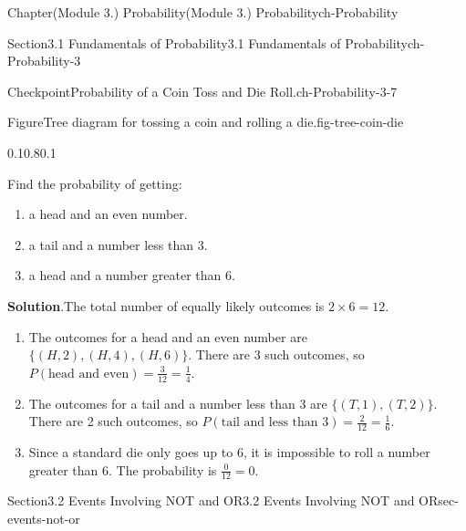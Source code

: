 \documentclass[oneside,10pt,]{book}
\newcommand{\blocktitlefont}{\relax}
\begin{document}
\begin{chapterptx}{Chapter}{(Module 3.) Probability}{}{(Module 3.) Probability}{}{}{ch-Probability}
\begin{sectionptx}{Section}{3.1 Fundamentals of Probability}{}{3.1 Fundamentals of Probability}{}{}{ch-Probability-3}
\begin{inlineexercise}{Checkpoint}{Probability of a Coin Toss and Die Roll.}{ch-Probability-3-7}
\begin{figureptx}{Figure}{Tree diagram for tossing a coin and rolling a die.}{fig-tree-coin-die}{}
\begin{image}{0.1}{0.8}{0.1}{}
{%
}%
\end{image}%
\tcblower
\end{figureptx}%
Find the probability of getting:%
%
\begin{enumerate}
\item{}a head and an even number.%
\item{}a tail and a number less than 3.%
\item{}a head and a number greater than 6.%
\end{enumerate}
\par\smallskip%
\noindent\textbf{\blocktitlefont Solution}.\hypertarget{ch-Probability-3-7-3}{}\quad{}The total number of equally likely outcomes is \(2 \times 6 = 12\).%
%
\begin{enumerate}
\item{}The outcomes for a head and an even number are \(\{(H, 2), (H, 4), (H, 6)\}\). There are 3 such outcomes, so \(P(\text{head and even}) = \frac{3}{12} = \frac{1}{4}\).%
\item{}The outcomes for a tail and a number less than 3 are \(\{(T, 1), (T, 2)\}\). There are 2 such outcomes, so \(P(\text{tail and less than 3}) = \frac{2}{12} = \frac{1}{6}\).%
\item{}Since a standard die only goes up to 6, it is impossible to roll a number greater than 6. The probability is \(\frac{0}{12} = 0\).%
\end{enumerate}
\end{inlineexercise}%
\end{sectionptx}
%
%
\typeout{************************************************}
\typeout{************************************************}
%
\begin{sectionptx}{Section}{3.2 Events Involving NOT and OR}{}{3.2 Events Involving NOT and OR}{}{}{sec-events-not-or}

\end{sectionptx}
\end{chapterptx}
\end{document}

